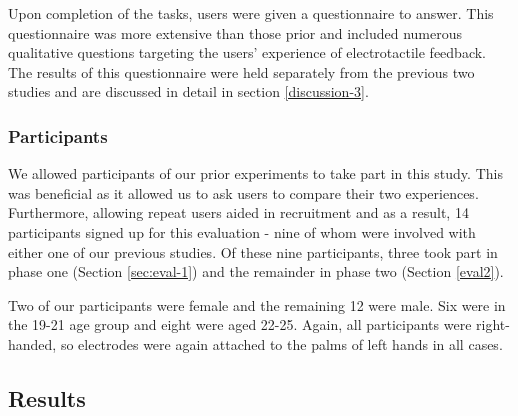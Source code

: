 \documentclass{mpaper}
\begin{document}
Upon completion of the tasks, users were given a questionnaire to answer. This questionnaire was more extensive than those prior and included numerous qualitative questions targeting the users' experience of electrotactile feedback. The results of this questionnaire were held separately from the previous two studies and are discussed in detail in section \ref{discussion-3}.

\subsubsection{Participants}\label{participants-3}
We allowed participants of our prior experiments to take part in this study. This was beneficial as it allowed us to ask users to compare their two experiences. Furthermore, allowing repeat users aided in recruitment and as a result, 14 participants signed up for this evaluation - nine of whom were involved with either one of our previous studies. Of these nine participants, three took part in phase one (Section \ref{sec:eval-1}) and the remainder in phase two (Section \ref{eval2}). 

Two of our participants were female and the remaining 12 were male. Six were in the 19-21 age group and eight were aged 22-25. Again, all participants were right-handed, so electrodes were again attached to the palms of left hands in all cases.

\subsection{Results}\label{results-3}
\end{document}
